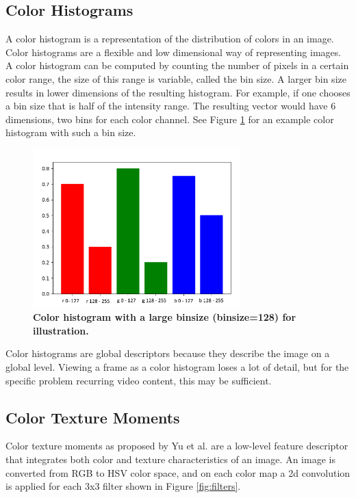 \documentclass{article}
\begin{document}
\subsection{Color Histograms}
A color histogram is a representation of the distribution of colors in an image. Color histograms are a flexible and low dimensional way of representing images. A color histogram can be computed by counting the number of pixels in a certain color range, the size of this range is variable, called the bin size. A larger bin size results in lower dimensions of the resulting histogram. For example, if one chooses a bin size that is half of the intensity range. The resulting vector would have 6 dimensions, two bins for each color channel. See Figure \ref{fig:colorhistogram} for an example color histogram with such a bin size.
\begin{figure}[H]
	\includegraphics[width=8cm]{images/colorhistogram.png}
	\centering
	\caption{\textbf{Color histogram with a large binsize (binsize=128) for illustration.}}
	\label{fig:colorhistogram}
\end{figure}
Color histograms are global descriptors because they describe the image on a global level. Viewing a frame as a color histogram loses a lot of detail, but for the specific problem recurring video content, this may be sufficient.

\subsection{Color Texture Moments}
Color texture moments as proposed by Yu et al. \cite{yu2002colortexturemoments} are a low-level feature descriptor that integrates both color and texture characteristics of an image. An image is converted from RGB to HSV color space, and on each color map a 2d convolution is applied for each 3x3 filter shown in Figure \ref{fig:filters}.
\end{document}
